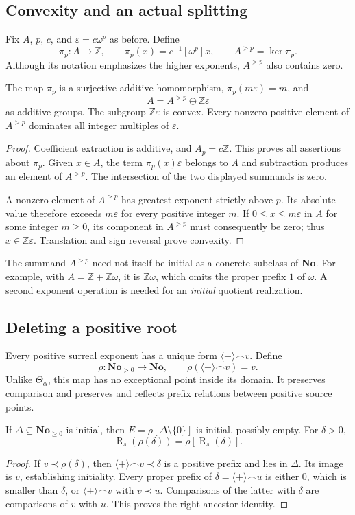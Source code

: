 \documentclass[11pt]{article}
\theoremstyle{definition}
\theoremstyle{remark}
\newcommand{\No}{\ensuremath{\mathbf{No}}}
\newcommand{\Z}{\mathbb{Z}}
\newcommand{\Rs}{\operatorname{R}_{s}}
\newcommand{\cat}{\mathbin{\frown}}
\newcommand{\plus}{\langle+\rangle}
\newcommand{\pr}{\mathrel{\prec}}
\newcommand{\tht}{\Theta_{\alpha}}
\begin{document}
\subsection{Convexity and an actual splitting}
Fix $A$, $p$, $c$, and $\varepsilon=c\omega^p$ as before. Define
\[
 \pi_p:A\longrightarrow\Z,
 \qquad \pi_p(x)=c^{-1}[\omega^p]x,
 \qquad A^{>p}=\ker\pi_p.
\]
Although its notation emphasizes the higher exponents, $A^{>p}$ also
contains zero.

\begin{lemma}\label{isg:lem:split}
The map $\pi_p$ is a surjective additive homomorphism,
$\pi_p(m\varepsilon)=m$, and
\[
 A=A^{>p}\oplus\Z\varepsilon
\]
as additive groups. The subgroup $\Z\varepsilon$ is convex. Every
nonzero positive element of $A^{>p}$ dominates all integer multiples of
$\varepsilon$.
\end{lemma}
\begin{proof}
Coefficient extraction is additive, and $A_p=c\Z$. This proves all
assertions about $\pi_p$. Given $x\in A$, the term
$\pi_p(x)\varepsilon$ belongs to $A$ and subtraction produces an element
of $A^{>p}$. The intersection of the two displayed summands is zero.

A nonzero element of $A^{>p}$ has greatest exponent strictly above $p$.
Its absolute value therefore exceeds $m\varepsilon$ for every positive
integer $m$. If $0\le x\le m\varepsilon$ in $A$ for some integer
$m\ge0$, its component in $A^{>p}$ must consequently be zero; thus
$x\in\Z\varepsilon$. Translation and sign reversal prove convexity.
\end{proof}

The summand $A^{>p}$ need not itself be initial as a concrete subclass
of $\No$. For example, with $A=\Z+\Z\omega$, it is $\Z\omega$,
which omits the proper prefix $1$ of $\omega$. A second exponent operation
is needed for an \emph{initial} quotient realization.

\subsection{Deleting a positive root}
Every positive surreal exponent has a unique form $\plus\cat v$.
Define
\[
 \rho:\No_{>0}\longrightarrow\No,\qquad
 \rho(\plus\cat v)=v.
\]
Unlike $\tht$, this map has no exceptional point inside its domain.
It preserves comparison and preserves and reflects prefix relations
between positive source points.

\begin{lemma}\label{isg:lem:rho}
If $\Delta\subseteq\No_{\ge0}$ is initial, then
$E=\rho[\Delta\setminus\{0\}]$ is initial, possibly empty. For
$\delta>0$,
\[
 \Rs(\rho(\delta))=\rho[\Rs(\delta)].
\]
\end{lemma}
\begin{proof}
If $v\pr\rho(\delta)$, then $\plus\cat v\pr\delta$ is a positive
prefix and lies in $\Delta$. Its image is $v$, establishing initiality.
Every proper prefix of $\delta=\plus\cat u$ is either $0$, which is
smaller than $\delta$, or $\plus\cat v$ with $v\pr u$.
Comparisons of the latter with $\delta$ are comparisons of $v$ with $u$.
This proves the right-ancestor identity.
\end{proof}
\end{document}
